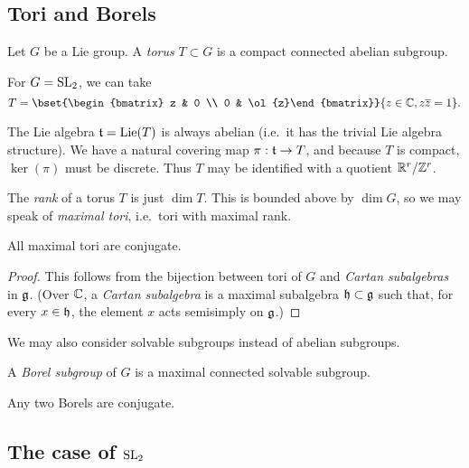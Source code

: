 \documentclass{article}
\begin{document}
\subsection{Tori and Borels}

\begin{dfn}
	Let $G$ be a Lie group.
	A \emph{torus} $T \subset G$ is a compact connected abelian subgroup.
\end{dfn}

\begin{ex}
	For $G = \mathrm{SL}_2$, we can take
	\[
		T = \bset{\begin{bmatrix} z & 0 \\ 0 & \ol{z}\end{bmatrix}}{z \in \CC, z \ol{z} = 1}.
	\]
\end{ex}

The Lie algebra $\mathfrak{t} = \operatorname{Lie}(T)$ is always abelian (i.e.\ it has the trivial Lie algebra structure).
We have a natural covering map $\pi: \mathfrak{t} \to T$, and because $T$ is compact, $\ker(\pi)$ must be discrete.
Thus $T$ may be identified with a quotient $\mathbb{R}^r / \mathbb{Z}^r$.

The \emph{rank} of a torus $T$ is just $\dim T$.
This is bounded above by $\dim G$, so we may speak of \emph{maximal tori}, i.e.\ tori with maximal rank.

\begin{thm}
	All maximal tori are conjugate.
\end{thm}

\begin{proof}
	This follows from the bijection between tori of $G$ and \emph{Cartan subalgebras} in $\mathfrak{g}$.
	(Over $\mathbb{C}$, a \emph{Cartan subalgebra} is a maximal subalgebra $\mathfrak{h} \subset \mathfrak{g}$ such that, for every $x \in \mathfrak{h}$, the element $x$ acts semisimply on $\mathfrak{g}$.)
\end{proof}

We may also consider solvable subgroups instead of abelian subgroups.

\begin{dfn}
	A \emph{Borel subgroup} of $G$ is a maximal connected solvable subgroup.
\end{dfn}

\begin{thm}
	Any two Borels are conjugate.
\end{thm}

\subsection{The case of $\mathrm{SL}_2$}
\end{document}
